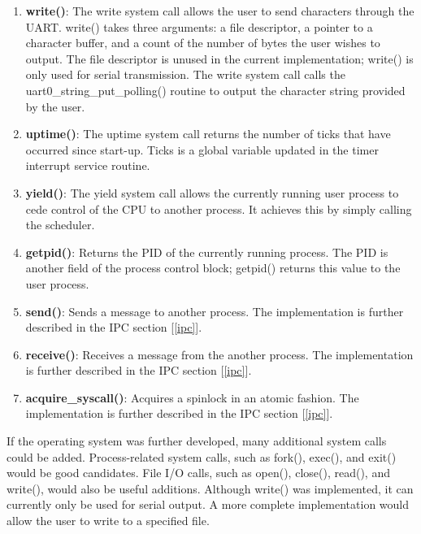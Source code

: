 \documentclass[12pt]{article}
\begin{document}
\begin{enumerate}
	\item \textbf{write()}\label{write}: The write system call allows the user to send characters
	      through the UART. write() takes three arguments: a file descriptor, a pointer
	      to a character buffer, and a count of the number of bytes the user wishes to
	      output. The file descriptor is unused in the current implementation; write()
	      is only used for serial transmission. The write system call calls the
	      uart0\_string\_put\_polling() routine to output the character string
	      provided by the user.

	\item \textbf{uptime()}\label{uptime}: The uptime system call returns the number of ticks that
	      have occurred since start-up. Ticks is a global variable updated in the timer
	      interrupt service routine.

	\item \textbf{yield()}\label{yield}: The yield system call allows the currently running user
	      process to cede control of the CPU to another process. It achieves this by
	      simply calling the scheduler.

	\item \textbf{getpid()}: Returns the PID of the currently running process. The
	      PID is another field of the process control block; getpid() returns this
	      value to the user process.

	\item \textbf{send()}\label{send}: Sends a message to another process. The implementation is
	      further described in the IPC section [\ref{ipc}].

	\item \textbf{receive()}\label{receive}: Receives a message from the another process. The
	      implementation is further described in the IPC section [\ref{ipc}].

	\item \textbf{acquire\_syscall()}\label{acquire}: Acquires a spinlock in an atomic fashion. The
	      implementation is further described in the IPC section [\ref{ipc}].
\end{enumerate}

If the operating system was further developed, many additional
system calls could be added. Process-related system calls, such as
fork(), exec(), and exit() would be good candidates. File I/O
calls, such as open(), close(), read(), and write(), would also be
useful additions. Although write() was implemented, it can
currently only be used for serial output. A more complete
implementation would allow the user to write to a specified file.
\end{document}

